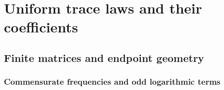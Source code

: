 \documentclass[11pt,a4paper]{article}
\theoremstyle{definition}
\numberwithin{equation}{section}
\begin{document}
\section{Uniform trace laws and their coefficients}\label{unified:sec:trace}
\begingroup
\let\section\subsection
\let\subsection\subsubsection






\endgroup
\section{Finite matrices and endpoint geometry}\label{unified:sec:finite}
\begingroup
\let\section\subsection
\let\subsection\subsubsection




\endgroup
\section{Commensurate frequencies and odd logarithmic terms}\label{unified:sec:frequency}
\begingroup
\let\section\subsection
\let\subsection\subsubsection


\endgroup
\end{document}
